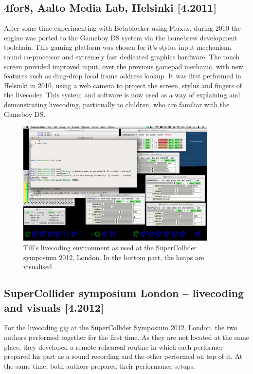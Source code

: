 \documentclass[letterpaper, 12pt]{article}
\begin{document}
\subsection{4for8, Aalto Media Lab, Helsinki [4.2011]}
\label{sub:4for8}

After some time experimenting with Betablocker using Fluxus, during 2010 the engine was ported to the Gameboy DS system via the homebrew development toolchain. This gaming platform was chosen for it's stylus input mechanism, sound co-processor and extremely fast dedicated graphics hardware. The touch screen provided improved input, over the previous gamepad mechanic, with new features such as drag-drop local frame address lookup. It was first performed in Helsinki in 2010, using a web camera to project the screen, stylus and fingers of the livecoder. This system and software is now used as a way of explaining and demonstrating livecoding, particually to children, who are familiar with the Gameboy DS.
\parskip 18pt

\begin{figure}
	\centering
\includegraphics[width=10cm]{2012-SuperColliderSymposiumLiveCodingEnvironment-tills}
	\caption{Till's livecoding environment as used at the SuperCollider symposium 2012, London. In the bottom part, the heaps are visualised.}
	\label{fig:fig_2012-SuperColliderSymposiumLiveCodingEnvironment-till}
\end{figure}

\subsection{SuperCollider symposium London -- livecoding and visuals [4.2012]}
\label{sub:livecoding_and_visuals}

For the livecoding gig at the SuperCollider Symposium 2012, London, the two authors performed together for the first time. 
As they are not located at the same place, they developed a remote rehearsal routine in which each performer prepared his part as a sound recording and the other performed on top of it.
At the same time, both authors prepared their performance setups.
\end{document}
